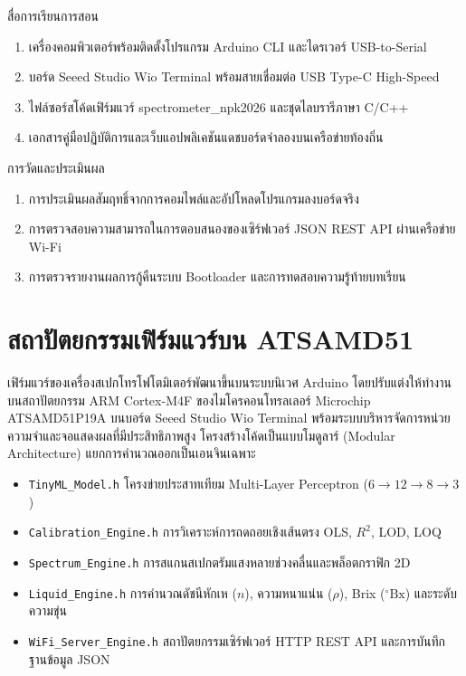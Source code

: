\begin{planbox}{สื่อการเรียนการสอน}
\begin{enumerate}[topsep=2pt, itemsep=1pt, partopsep=0pt, parsep=0pt, leftmargin=1.5em]
    \item เครื่องคอมพิวเตอร์พร้อมติดตั้งโปรแกรม Arduino CLI และไดรเวอร์ USB-to-Serial
    \item บอร์ด Seeed Studio Wio Terminal พร้อมสายเชื่อมต่อ USB Type-C High-Speed
    \item ไฟล์ซอร์สโค้ดเฟิร์มแวร์ spectrometer\_npk2026 และชุดไลบรารีภาษา C/C++
    \item เอกสารคู่มือปฏิบัติการและเว็บแอปพลิเคชันแดชบอร์ดจำลองบนเครือข่ายท้องถิ่น
\end{enumerate}
\end{planbox}

\begin{planbox}{การวัดและประเมินผล}
\begin{enumerate}[topsep=2pt, itemsep=1pt, partopsep=0pt, parsep=0pt, leftmargin=1.5em]
    \item การประเมินผลสัมฤทธิ์จากการคอมไพล์และอัปโหลดโปรแกรมลงบอร์ดจริง
    \item การตรวจสอบความสามารถในการตอบสนองของเซิร์ฟเวอร์ JSON REST API ผ่านเครือข่าย Wi-Fi
    \item การตรวจรายงานผลการกู้คืนระบบ Bootloader และการทดสอบความรู้ท้ายบทเรียน
\end{enumerate}
\end{planbox}

\clearpage

\section{สถาปัตยกรรมเฟิร์มแวร์บน ATSAMD51}
เฟิร์มแวร์ของเครื่องสเปกโทรโฟโตมิเตอร์พัฒนาขึ้นบนระบบนิเวศ Arduino โดยปรับแต่งให้ทำงานบนสถาปัตยกรรม ARM Cortex-M4F ของไมโครคอนโทรลเลอร์ Microchip ATSAMD51P19A บนบอร์ด Seeed Studio Wio Terminal พร้อมระบบบริหารจัดการหน่วยความจำและจอแสดงผลที่มีประสิทธิภาพสูง โครงสร้างโค้ดเป็นแบบโมดูลาร์ (Modular Architecture) แยกการคำนวณออกเป็นเอนจินเฉพาะ
\begin{itemize}[leftmargin=1.5em, itemsep=2pt]
    \item \texttt{TinyML\_Model.h} โครงข่ายประสาทเทียม Multi-Layer Perceptron ($6 \to 12 \to 8 \to 3$)
    \item \texttt{Calibration\_Engine.h} การวิเคราะห์การถดถอยเชิงเส้นตรง OLS, $R^2$, LOD, LOQ
    \item \texttt{Spectrum\_Engine.h} การสแกนสเปกตรัมแสงหลายช่วงคลื่นและพล็อตกราฟิก 2D
    \item \texttt{Liquid\_Engine.h} การคำนวณดัชนีหักเห ($n$), ความหนาแน่น ($\rho$), Brix ($^\circ\text{Bx}$) และระดับความขุ่น
    \item \texttt{WiFi\_Server\_Engine.h} สถาปัตยกรรมเซิร์ฟเวอร์ HTTP REST API และการบันทึกฐานข้อมูล JSON
\end{itemize}


